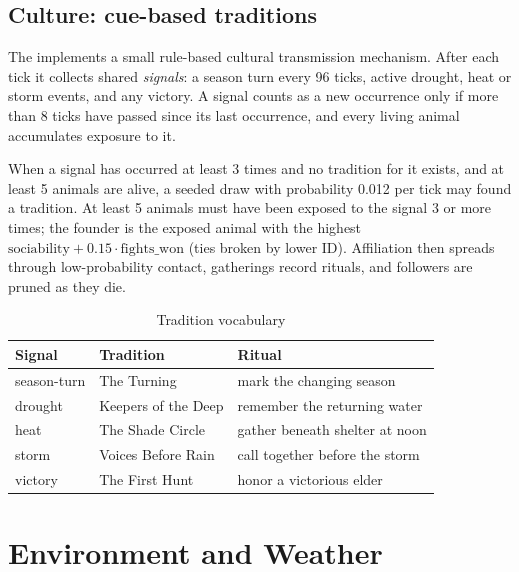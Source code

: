 \section{Culture: cue-based traditions}
The  implements a small rule-based cultural transmission
mechanism. After each tick it collects shared \emph{signals}: a season turn every
96 ticks, active drought, heat or storm events, and any victory. A signal counts as
a new occurrence only if more than 8 ticks have passed since its last occurrence,
and every living animal accumulates exposure to it.

When a signal has occurred at least 3 times and no tradition for it exists, and at
least 5 animals are alive, a seeded draw with probability 0.012 per tick may found
a tradition. At least 5 animals must have been exposed to the signal 3 or more
times; the founder is the exposed animal with the highest
$\text{sociability}+0.15\cdot\text{fights\_won}$ (ties broken by lower ID). Affiliation then
spreads through low-probability contact, gatherings record rituals, and followers
are pruned as they die.

\begin{table}[htbp]
\centering
\caption{Tradition vocabulary}
\begin{tabularx}{\textwidth}{llL}
\toprule
Signal & Tradition & Ritual \\
\midrule
season-turn & The Turning & mark the changing season \\
drought & Keepers of the Deep & remember the returning water \\
heat & The Shade Circle & gather beneath shelter at noon \\
storm & Voices Before Rain & call together before the storm \\
victory & The First Hunt & honor a victorious elder \\
\bottomrule
\end{tabularx}
\end{table}


\chapter{Environment and Weather}
\label{ch:env}

